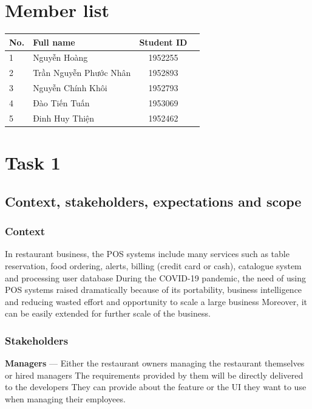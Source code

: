 \documentclass[a4paper]{article}
\numberwithin{equation}{section}
\begin{document}
\section*{Member list}
\begin{center}
  \begin{tabular}{llcc}
    \toprule
    \textbf{No.} & \textbf{Full name}     & \textbf{Student ID} \\
    \midrule
    1            & Nguyễn Hoàng           & 1952255             \\
    2            & Trần Nguyễn Phước Nhân & 1952893             \\
    3            & Nguyễn Chính Khôi      & 1952793             \\
    4            & Đào Tiến Tuấn          & 1953069             \\
    5            & Đinh Huy Thiện         & 1952462
    \\
    \bottomrule
  \end{tabular}
\end{center}

\newpage
\tableofcontents
\newpage

\section{Task 1}
\subsection{Context, stakeholders, expectations and scope}
\subsubsection{Context}
In restaurant business, the POS systems include many services such as table reservation, food ordering, alerts, billing (credit card or cash), catalogue system and processing user database
During the COVID-19 pandemic, the need of using POS systems raised dramatically because of its portability, business intelligence and reducing wasted effort and opportunity to scale a large business
Moreover, it can be easily extended for further scale of the business.

\subsubsection{Stakeholders}
\textbf{Managers} --- Either the restaurant owners managing the restaurant themselves or hired managers
The requirements provided by them will be directly delivered to the developers
They can provide about the feature or the UI they want to use when managing their employees.
\end{document}
